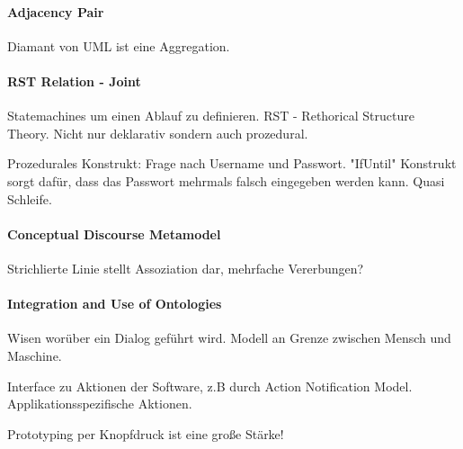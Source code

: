 \paragraph{Adjacency Pair}
Diamant von UML ist eine Aggregation.

\paragraph{RST Relation - Joint}
Statemachines um einen Ablauf zu definieren. RST - Rethorical Structure Theory.
Nicht nur deklarativ sondern auch prozedural. 

Prozedurales Konstrukt: Frage nach Username und Passwort. "IfUntil" Konstrukt
sorgt dafür, dass das Passwort mehrmals falsch eingegeben werden kann. Quasi Schleife.

\paragraph{Conceptual Discourse Metamodel}
Strichlierte Linie stellt Assoziation dar, mehrfache Vererbungen?
\paragraph{Integration and Use of Ontologies}
Wisen worüber ein Dialog geführt wird. Modell an Grenze zwischen Mensch und Maschine.

Interface zu Aktionen der Software, z.B durch Action Notification Model.
Applikationsspezifische Aktionen.

Prototyping per Knopfdruck ist eine große Stärke!


